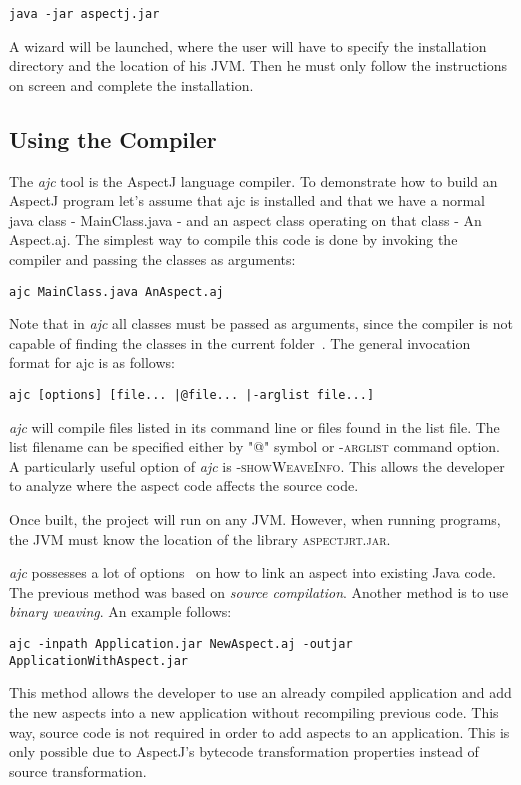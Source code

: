 \documentclass{template}
\begin{document}
\verb!java -jar aspectj.jar!

A wizard will be launched, where the user will have to specify the installation directory and the location of his JVM. Then he must only follow the instructions on screen and complete the installation.

\subsection{Using the Compiler}

The \textit{ajc} tool is the AspectJ language compiler. To demonstrate how to build an AspectJ program let's assume that ajc is installed and that we have a normal java class - MainClass.java - and an aspect class operating on that class - An Aspect.aj. The simplest way to compile this code is done by invoking the compiler and passing the classes as arguments:

\verb!ajc MainClass.java AnAspect.aj!

Note that in \textit{ajc} all classes must be passed as arguments, since the compiler is not capable of finding the classes in the current folder~\cite{ajcsite}. The general invocation format for ajc is as follows: 

\verb!ajc [options] [file... |@file... |-arglist file...]!

\textit{ajc} will compile files listed in its command line or files found in the list file. The list filename can be specified 
either by "@" symbol or \textsc{-arglist} command option. A particularly useful option of \textit{ajc} is \textsc{-showWeaveInfo}. This allows the developer to analyze where the aspect code affects the source code.

Once built, the project will run on any JVM. However, when running programs, the JVM must know the location of the library \textsc{aspectjrt.jar}.

\textit{ajc} possesses a lot of options~\cite{ajcsite} on how to link an aspect into existing Java code. The previous method was based on \textit{source compilation}. Another method is to use \textit{binary weaving}. An example follows:

\verb!ajc -inpath Application.jar NewAspect.aj -outjar ApplicationWithAspect.jar!

This method allows the developer to use an already compiled application and add the new aspects into a new application without recompiling previous code. This way, source code is not required in order to add aspects to an application. This is only possible due to AspectJ's bytecode transformation properties instead of source transformation.
\end{document}
